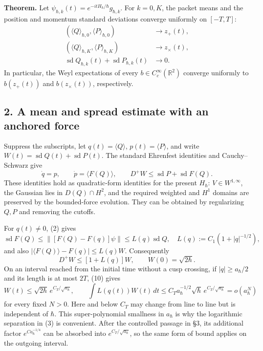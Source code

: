 \documentclass[11pt,a4paper]{article}
\begin{document}
\textbf{Theorem.} Let
\(\psi_{\hbar,k}(t)=e^{-itH_\hbar/\hbar}g_{\hbar,k}\). For \(k=0,K\),
the packet means and the position and momentum standard deviations
converge uniformly on \([-T,T]\): \[
 \begin{aligned}
 (\langle Q\rangle_{\hbar,0},\langle P\rangle_{\hbar,0})
       &\longrightarrow z_+(t),\\
 (\langle Q\rangle_{\hbar,K},\langle P\rangle_{\hbar,K})
       &\longrightarrow z_\times(t),\\
 \operatorname{sd}Q_{\hbar,k}(t)+\operatorname{sd}P_{\hbar,k}(t)
       &\longrightarrow0.
 \end{aligned}\tag{7}
\] In particular, the Weyl expectations of every
\(b\in C_c^\infty(\mathbb R^2)\) converge uniformly to \(b(z_+(t))\) and
\(b(z_\times(t))\), respectively.

\subsection{2. A mean and spread estimate with an anchored
force}\label{a-mean-and-spread-estimate-with-an-anchored-force}

Suppress the subscripts, let \(q(t)=\langle Q\rangle\),
\(p(t)=\langle P\rangle\), and write
\(W(t)=\operatorname{sd}Q(t)+\operatorname{sd}P(t)\). The standard
Ehrenfest identities and Cauchy--Schwarz give \[
 \dot q=p,\qquad \dot p=\langle F(Q)\rangle,\qquad
 D^+W\le\operatorname{sd}P+\operatorname{sd}F(Q).\tag{8}
\] These identities hold as quadratic-form identities for the present
\(H_\hbar\): \(V\in W^{1,\infty}\), the Gaussian lies in
\(D(Q)\cap H^2\), and the required weighted and \(H^1\) domains are
preserved by the bounded-force evolution. They can be obtained by
regularizing \(Q,P\) and removing the cutoffs.

For \(q(t)\ne0\), (2) gives \[
 \operatorname{sd}F(Q)
 \le\|[F(Q)-F(q)]\psi\|
 \le L(q)\operatorname{sd}Q,\quad
 L(q):=C_1(1+|q|^{-1/2}),\tag{9}
\] and also \(|\langle F(Q)\rangle-F(q)|\le L(q)W\). Consequently \[
 D^+W\le[1+L(q)]W,\qquad W(0)=\sqrt{2\hbar}.\tag{10}
\] On an interval reached from the initial time without a cusp crossing,
if \(|q|\ge a_\hbar/2\) and its length is at most \(2T\), (10) gives \[
 W(t)\le\sqrt{2\hbar}\,e^{C_T/\sqrt{a_\hbar}},\qquad
 \int L(q(t))W(t)\,dt
    \le C_Ta_\hbar^{-1/2}\sqrt\hbar\,
                  e^{C_T/\sqrt{a_\hbar}}
    =o(a_\hbar^N)\tag{11}
\] for every fixed \(N>0\). Here and below \(C_T\) may change from line
to line but is independent of \(\hbar\). This super-polynomial smallness
in \(a_\hbar\) is why the logarithmic separation in (3) is convenient.
After the controlled passage in §3, its additional factor
\(e^{Ca_\hbar^{-1/4}}\) can be absorbed into \(e^{C_T/\sqrt{a_\hbar}}\),
so the same form of bound applies on the outgoing interval.
\end{document}
